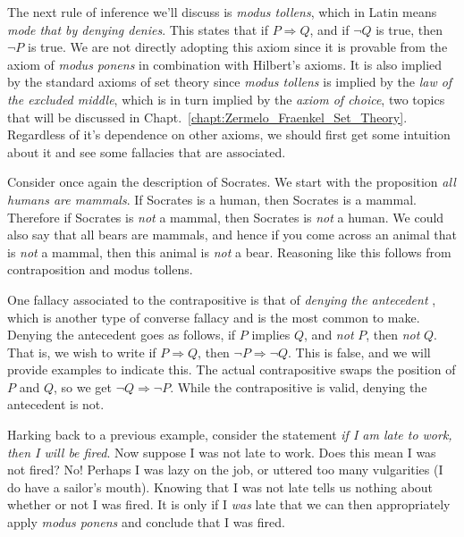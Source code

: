         The next rule of inference we'll discuss is
        \textit{modus tollens}, which in Latin means
        \textit{mode that by denying denies}. This states that if
        $P\Rightarrow{Q}$, and if $\neg{Q}$ is true, then $\neg{P}$ is true. We
        are not directly adopting this axiom since it is provable from the
        axiom of \textit{modus ponens} in combination with Hilbert's axioms.
        It is also implied by the standard axioms of set theory since
        \textit{modus tollens} is implied by the
        \textit{law of the excluded middle},
        which is in turn implied by the
        \textit{axiom of choice}, two topics that will be
        discussed in Chapt.~\ref{chapt:Zermelo_Fraenkel_Set_Theory}. Regardless
        of it's dependence on other axioms, we should first get some
        intuition about it and see some fallacies that are associated.
        \begin{example}
            Consider once again the description of Socrates. We start with the
            proposition \textit{all humans are mammals}. If Socrates is a human,
            then Socrates is a mammal. Therefore if Socrates is \textit{not} a
            mammal, then Socrates is \textit{not} a human. We could also say
            that all bears are mammals, and hence if you come across an animal
            that is \textit{not} a mammal, then this animal is \textit{not} a
            bear. Reasoning like this follows from contraposition and
            modus tollens.
        \end{example}
        One fallacy associated to the contrapositive is that of
        \textit{denying the antecedent}%
        , which is another type of
        converse fallacy and is the most common to make. Denying the antecedent
        goes as follows, if $P$ implies $Q$, and \textit{not} $P$, then
        \textit{not} $Q$. That is, we wish to write if $P\Rightarrow{Q}$, then
        $\neg{P}\Rightarrow\neg{Q}$. This is false, and we will provide
        examples to indicate this. The actual contrapositive swaps the
        position of $P$ and $Q$, so we get $\neg{Q}\Rightarrow\neg{P}$. While
        the contrapositive is valid, denying the antecedent is not.
        \begin{example}
            Harking back to a previous example, consider the statement
            \textit{if I am late to work, then I will be fired}. Now suppose I
            was not late to work. Does this mean I was not fired? No! Perhaps I
            was lazy on the job, or uttered too many vulgarities (I do have a
            sailor's mouth). Knowing that I was not late tells us nothing about
            whether or not I was fired. It is only if I \textit{was} late that
            we can then appropriately apply \textit{modus ponens} and conclude
            that I was fired.
        \end{example}
